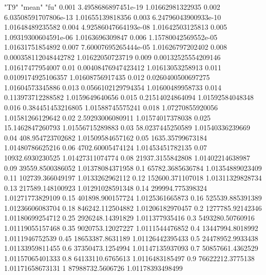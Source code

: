 "T9" "mean" "fu"
0.001 3.4958686897451e-19 1.01662981322935
0.002 6.03508591707806e-13 1.01655139818356
0.003 6.24796043900933e-10 1.01648489235582
0.004 4.92586047664193e-08 1.01642503125813
0.005 1.09319300604591e-06 1.0163696309847
0.006 1.15780042569552e-05 1.01631751854892
0.007 7.60007695265444e-05 1.01626797202402
0.008 0.000358112048442782 1.01622050723719
0.009 0.00132525554209146 1.01617477954007
0.01 0.00408476947423412 1.01613053258913
0.011 0.0109174925106357 1.01608756917435
0.012 0.0260400500697275 1.01604573345886
0.013 0.0566102129794354 1.01600489958733
0.014 0.113973712288582 1.0159649640656
0.015 0.21514024864094 1.01592584048348
0.016 0.384451453216805 1.01588745575241
0.018 1.07270855920056 1.01581266129642
0.02 2.59293006080911 1.01574017378038
0.025 15.1462847260793 1.01556715289883
0.03 58.0237445250589 1.01540336239669
0.04 408.954723702682 1.01509584657162
0.05 1635.35799673184 1.01480786625216
0.06 4702.60005474124 1.01453451782135
0.07 10932.6930230525 1.01427311074774
0.08 21937.3155842808 1.01402214638987
0.09 39559.8500386052 1.01378084371958
0.1 65782.3685636784 1.01354889023409
0.11 102739.366049197 1.0133262962112
0.12 152600.371107018 1.01311329828734
0.13 217589.148100923 1.01291028591348
0.14 299994.775398324 1.01271773829109
0.15 401898.900157724 1.0125361665873
0.16 525539.885391389 1.01236606083704
0.18 846242.112504882 1.01206182970457
0.2 1277785.92142346 1.01180699254712
0.25 2926248.14391829 1.011377935416
0.3 5493280.50760916 1.01119055157468
0.35 9020753.12027227 1.0111544476852
0.4 13447994.8018992 1.0111946752539
0.45 18653387.8631189 1.01126442395433
0.5 24478952.9933438 1.01133959811455
0.6 37350473.1254994 1.01147135937093
0.7 50857661.4362529 1.01157065401333
0.8 64133110.6765613 1.0116483185497
0.9 76622212.3775138 1.01171658673131
1 87988732.5606726 1.01178393498499
